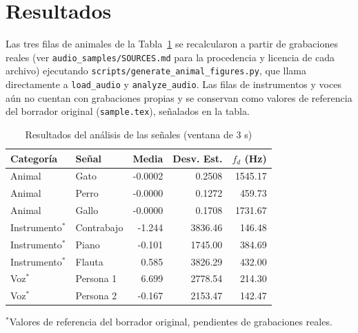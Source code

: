 
\section{Resultados}

Las tres filas de animales de la Tabla~\ref{tab:resultados} se recalcularon a partir de grabaciones reales (ver \texttt{audio\_samples/SOURCES.md} para la procedencia y licencia de cada archivo) ejecutando \texttt{scripts/generate\_animal\_figures.py}, que llama directamente a \texttt{load\_audio} y \texttt{analyze\_audio}. Las filas de instrumentos y voces aún no cuentan con grabaciones propias y se conservan como valores de referencia del borrador original (\texttt{sample.tex}), señalados en la tabla.

\begin{table}[!t]
\centering
\caption{Resultados del análisis de las señales (ventana de 3 s)}
\label{tab:resultados}
\small
\begin{tabular}{@{}l l r r r@{}}
\toprule
Categoría & Señal & Media & Desv. Est. & $f_d$ (Hz) \\
\midrule

Animal & Gato & -0.0002 & 0.2508 & 1545.17 \\
Animal & Perro & -0.0000 & 0.1272 & 459.73 \\
Animal & Gallo & -0.0000 & 0.1708 & 1731.67 \\

\midrule

Instrumento$^{*}$ & Contrabajo & -1.244 & 3836.46 & 146.48 \\
Instrumento$^{*}$ & Piano & -0.101 & 1745.00 & 384.69 \\
Instrumento$^{*}$ & Flauta & 0.585 & 3826.29 & 432.00 \\

\midrule

Voz$^{*}$ & Persona 1 & 6.699 & 2778.54 & 214.30 \\
Voz$^{*}$ & Persona 2 & -0.167 & 2153.47 & 142.47 \\

\bottomrule
\end{tabular}

\vspace{2pt}
{\footnotesize $^{*}$Valores de referencia del borrador original, pendientes de grabaciones reales.}
\end{table}

